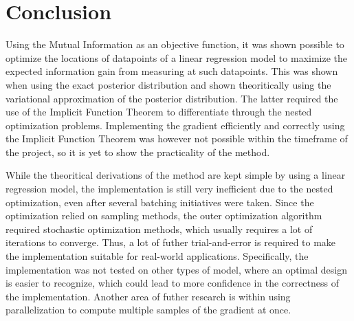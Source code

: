 \section{Conclusion}
Using the Mutual Information as an objective function, it was shown possible to optimize 
the locations of datapoints of a linear regression model to maximize the expected information gain from measuring at such datapoints.
This was shown when using the exact posterior distribution 
and shown theoritically using the variational approximation of the posterior distribution.
The latter required the use of the Implicit Function Theorem to differentiate through the nested optimization problems.
Implementing the gradient efficiently and correctly using the Implicit Function Theorem was however not possible within the timeframe of the project,
so it is yet to show the practicality of the method.

While the theoritical derivations of the method are kept simple by using a linear regression model, the implementation is still very inefficient
due to the nested optimization, even after several batching initiatives were taken.
Since the optimization relied on sampling methods, the outer optimization algorithm required stochastic optimization methods,
which usually requires a lot of iterations to converge. Thus, a lot of futher trial-and-error is required to make the implementation suitable for real-world applications.
Specifically, the implementation was not tested on other types of model, where an optimal design is easier to recognize, which could lead to more confidence in the correctness of the implementation.
Another area of futher research is within using parallelization to compute multiple samples of the gradient at once.
